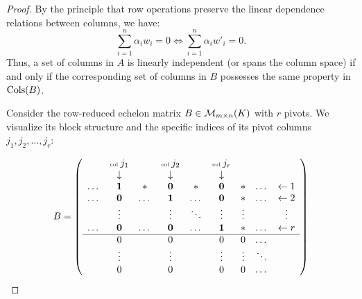 \begin{proof}
By the principle that row operations preserve the linear dependence relations between columns, we have:
\[
\sum_{i=1}^n \alpha_i w_i = 0 \iff \sum_{i=1}^n \alpha_i w'_i = 0.
\]
Thus, a set of columns in $A$ is linearly independent (or spans the column space) if and only if the corresponding set of columns in $B$ possesses the same property in $\operatorname{Cols}(B)$.

Consider the row-reduced echelon matrix $B \in \mathcal{M}_{m \times n}(K)$ with $r$ pivots. We visualize its block structure and the specific indices of its pivot columns $j_1, j_2, \dots, j_r$:

\begin{equation}
\label{eq:matrix_B_rigorous}
B = \left( 
\begin{array}{ccccccccc}
 & \text{\tiny col } j_1 & & \text{\tiny col } j_2 & & \text{\tiny col } j_r & & & \\
 & \downarrow & & \downarrow & & \downarrow & & & \\
\dots & \mathbf{1} & * & \mathbf{0} & * & \mathbf{0} & * & \dots & \leftarrow 1 \\
\dots & \mathbf{0} & \dots & \mathbf{1} & \dots & \mathbf{0} & * & \dots & \leftarrow 2 \\
 & \vdots & & \vdots & \ddots & \vdots & \vdots & & \vdots \\
\dots & \mathbf{0} & \dots & \mathbf{0} & \dots & \mathbf{1} & * & \dots & \leftarrow r \\ \hline
 & 0 & & 0 & & 0 & 0 & \dots & \\
 & \vdots & & \vdots & & \vdots & \vdots & \ddots & \\
 & 0 & & 0 & & 0 & 0 & \dots & 
\end{array} 
\right)
\end{equation}


\end{proof}
